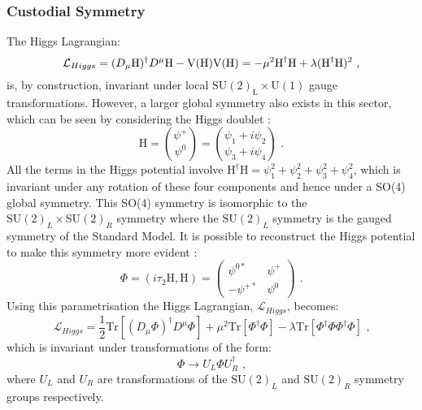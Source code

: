 \subsubsection{Custodial Symmetry}
The Higgs Lagrangian:
%
\begin{equation}
\mathcal{L}_{Higgs} = (D_{\mu}\text{H})^{\dagger}D^{\mu}\text{H} - \text{V}(\text{H}) \\
\text{V}(\text{H}) = -\mu^{2}\text{H}^{\dagger}\text{H} + \lambda (\text{H}^{\dagger}\text{H})^{2} \text{ ,}
\end{equation}
%
\noindent is, by construction, invariant under local $\text{SU}(2)_{\text{L}} \times \text{U}(1)$ gauge transformations.  However, a larger global symmetry also exists in this sector, which can be seen by considering the Higgs doublet \cite{Ellis:1991qj}:
%
\begin{equation}
\text{H} = \binom{\psi^{+}}{\psi^{0}} = \binom{\psi_{1} + i\psi_{2}}{\psi_{3} + i\psi_{4}} \text{ .}
\end{equation}
%
\noindent All the terms in the Higgs potential involve $\text{H}^{\dagger}\text{H} = \psi_{1}^{2} + \psi_{2}^{2} + \psi_{3}^{2} + \psi_{4}^{2}$, which is invariant under any rotation of these four components and hence under a SO(4) global symmetry.  This SO(4) symmetry is isomorphic to the $\text{SU}(2)_{L} \times \text{SU}(2)_{R}$ symmetry where the $\text{SU}(2)_{L}$ symmetry is the gauged symmetry of the Standard Model.  It is possible to reconstruct the Higgs potential to make this symmetry more evident \cite{Andersen:2011yj, Grojean:2007zz}:
%
\begin{equation}
\Phi = (i\tau_{2}\text{H}, \text{H}) = 
\begin{pmatrix}
\psi^{0*} & \psi^{+} \\
-\psi^{+*} & \psi^{0}
\end{pmatrix} 
\text{ .}
\end{equation}
%
\noindent Using this parametrisation the Higgs Lagrangian, $\mathcal{L}_{Higgs}$, becomes:
%
\begin{equation}
\mathcal{L}_{Higgs} =  \frac{1}{2}\text{Tr}[(D_{\mu}\Phi)^{\dagger}D^{\mu}\Phi] + \mu^{2}\text{Tr}[\Phi^{\dagger}\Phi] - \lambda \text{Tr}[\Phi^{\dagger}\Phi\Phi^{\dagger}\Phi] \text{ ,}
\end{equation}
%
\noindent which is invariant under transformations of the form:
%
\begin{equation}
\Phi \rightarrow U_{L} \Phi U_{R}^{\dagger} \text{ ,}
\end{equation}
%
\noindent where $U_{L}$ and $U_{R}$ are transformations of the $\text{SU}(2)_{L}$ and $\text{SU}(2)_{R}$ symmetry groups respectively.

